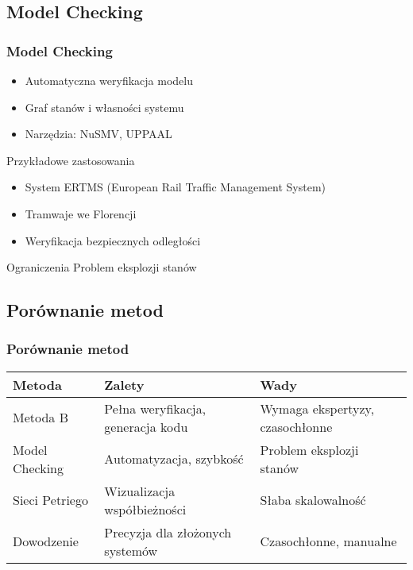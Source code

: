 \documentclass{beamer}
\begin{document}
\subsection{Model Checking}
\begin{frame}
\frametitle{Model Checking}
\begin{itemize}
\item Automatyczna weryfikacja modelu
\item Graf stanów i własności systemu
\item Narzędzia: NuSMV, UPPAAL
\end{itemize}

\begin{exampleblock}{Przykładowe zastosowania}
\begin{itemize}
\item System ERTMS (European Rail Traffic Management System)
\
\item Tramwaje we Florencji
\item Weryfikacja bezpiecznych odległości
\end{itemize}
\end{exampleblock}

\begin{alertblock}{Ograniczenia}
Problem eksplozji stanów
\end{alertblock}
\end{frame}

\subsection{Porównanie metod}
\begin{frame}
\frametitle{Porównanie metod}
\scriptsize
\begin{tabularx}{\textwidth}{|l|X|X|}
\hline
\textbf{Metoda} & \textbf{Zalety} & \textbf{Wady} \\
\hline
Metoda B &
Pełna weryfikacja, generacja kodu &
Wymaga ekspertyzy, czasochłonne \\
\hline
Model Checking &
Automatyzacja, szybkość &
Problem eksplozji stanów \\
\hline
Sieci Petriego &
Wizualizacja współbieżności &
Słaba skalowalność \\
\hline
Dowodzenie &
Precyzja dla złożonych systemów &
Czasochłonne, manualne \\
\hline
\end{tabularx}
\end{frame}
\end{document}

